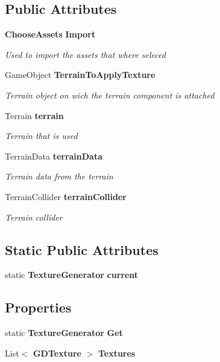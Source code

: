 \subsection*{Public Attributes}
\begin{DoxyCompactItemize}
\item 
\textbf{ Choose\+Assets} \textbf{ Import}
\begin{DoxyCompactList}\small\item\em Used to import the assets that where seleced \end{DoxyCompactList}\item 
Game\+Object \textbf{ Terrain\+To\+Apply\+Texture}
\begin{DoxyCompactList}\small\item\em Terrain object on wich the terrain component is attached \end{DoxyCompactList}\item 
Terrain \textbf{ terrain}
\begin{DoxyCompactList}\small\item\em Terrain that is used \end{DoxyCompactList}\item 
Terrain\+Data \textbf{ terrain\+Data}
\begin{DoxyCompactList}\small\item\em Terrain data from the terrain \end{DoxyCompactList}\item 
Terrain\+Collider \textbf{ terrain\+Collider}
\begin{DoxyCompactList}\small\item\em Terrain collider \end{DoxyCompactList}\end{DoxyCompactItemize}
\subsection*{Static Public Attributes}
\begin{DoxyCompactItemize}
\item 
static \textbf{ Texture\+Generator} \textbf{ current}
\end{DoxyCompactItemize}
\subsection*{Properties}
\begin{DoxyCompactItemize}
\item 
static \textbf{ Texture\+Generator} \textbf{ Get}\hspace{0.3cm}{\ttfamily  [get]}
\item 
List$<$ \textbf{ G\+D\+Texture} $>$ \textbf{ Textures}\hspace{0.3cm}{\ttfamily  [get]}
\end{DoxyCompactItemize}


